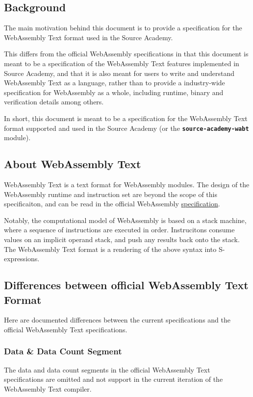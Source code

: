 \subsection{Background}

The main motivation behind this document is to provide a specification for the WebAssembly Text
format used in the Source Academy. \vspace{1em}

This differs from the official WebAssembly specifications
in that this document is meant to be a specification of the WebAssembly Text features implemented
in Source Academy, and that it is also meant for users to write and understand WebAssembly Text as
a language, rather than to provide a industry-wide specification for WebAssembly as a whole,
including runtime, binary and verification details among others.  \vspace{1em}

In short, this document is meant to be a specification for the WebAssembly Text format supported and used
in the Source Academy (or the \textbf{\texttt{source-academy-wabt}} module).

\subsection{About WebAssembly Text}
WebAssembly Text is a text format for WebAssembly modules. The design of the 
WebAssembly runtime and instruction set are beyond the scope of this specificaiton, 
and can be read in the official WebAssembly 
\href{https://webassembly.github.io/spec/core/_download/WebAssembly.pdf}{specification}. \vspace{1em}

Notably, the computational model of WebAssembly is based on a stack machine, 
where a sequence of instructions are executed in order. Instrucitons consume 
values on an implicit operand stack, and push any results back onto the stack.
The WebAssembly Text format is a rendering of the above syntax into S-expressions.

\subsection{Differences between official WebAssembly Text Format}

Here are documented differences between the current specifications and the official WebAssembly Text specifications.

\subsubsection{Data \& Data Count Segment}

The data and data count segments in the official WebAssembly Text specifications are omitted and not support in the current iteration of the WebAssembly Text compiler.
